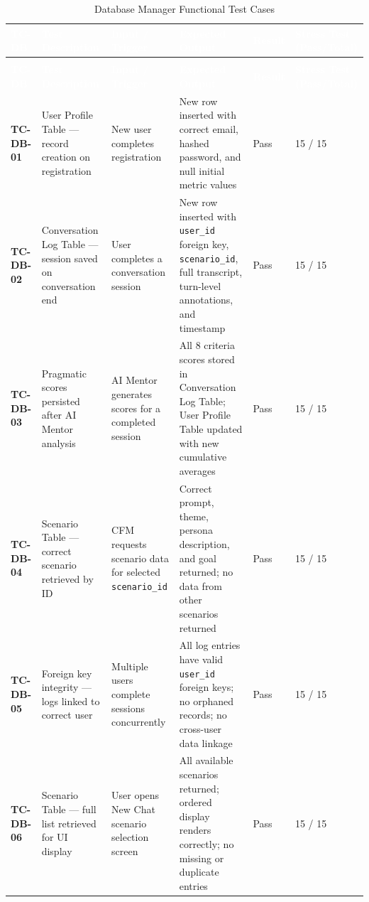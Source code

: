 \begin{longtable}{>{\bfseries}p{1.2cm} p{3.0cm} p{3.5cm} p{4.5cm} p{1.0cm} p{1.5cm}}
\caption{Database Manager Functional Test Cases}
\label{tab:tc-db} \\
 
\rowcolor{headerblue}
\textcolor{white}{\textbf{TC-DB}} &
\textcolor{white}{\textbf{Test Description}} &
\textcolor{white}{\textbf{Input / Trigger}} &
\textcolor{white}{\textbf{Expected Output}} &
\textcolor{white}{\textbf{Result}} &
\textcolor{white}{\textbf{Stress Test (Pass/Total)}} \\
\endfirsthead
 
\multicolumn{6}{c}{\tablename\ \thetable{} -- continued} \\
\rowcolor{headerblue}
\textcolor{white}{\textbf{TC-DB}} &
\textcolor{white}{\textbf{Test Description}} &
\textcolor{white}{\textbf{Input / Trigger}} &
\textcolor{white}{\textbf{Expected Output}} &
\textcolor{white}{\textbf{Result}} &
\textcolor{white}{\textbf{Stress Test (Pass/Total)}} \\
\endhead
 
\midrule
TC-DB-01 & User Profile Table --- record creation on registration & New user completes registration & New row inserted with correct email, hashed password, and null initial metric values & Pass & 15 / 15 \\
\midrule
TC-DB-02 & Conversation Log Table --- session saved on conversation end & User completes a conversation session & New row inserted with \texttt{user\_id} foreign key, \texttt{scenario\_id}, full transcript, turn-level annotations, and timestamp & Pass & 15 / 15 \\
\midrule
TC-DB-03 & Pragmatic scores persisted after AI Mentor analysis & AI Mentor generates scores for a completed session & All 8 criteria scores stored in Conversation Log Table; User Profile Table updated with new cumulative averages & Pass & 15 / 15 \\
\midrule
TC-DB-04 & Scenario Table --- correct scenario retrieved by ID & CFM requests scenario data for selected \texttt{scenario\_id} & Correct prompt, theme, persona description, and goal returned; no data from other scenarios returned & Pass & 15 / 15 \\
\midrule
TC-DB-05 & Foreign key integrity --- logs linked to correct user & Multiple users complete sessions concurrently & All log entries have valid \texttt{user\_id} foreign keys; no orphaned records; no cross-user data linkage & Pass & 15 / 15 \\
\midrule
TC-DB-06 & Scenario Table --- full list retrieved for UI display & User opens New Chat scenario selection screen & All available scenarios returned; ordered display renders correctly; no missing or duplicate entries & Pass & 15 / 15 \\
\bottomrule
\end{longtable}

